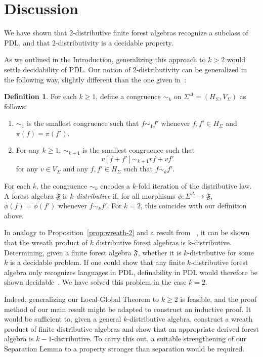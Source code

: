 \documentclass[sigplan,9pt]{acmart}\settopmatter{printfolios=true,printccs=false,printacmref=false}
\newcounter{thm}
\newcounter{theorem}
\theoremstyle{definition}
\newtheorem{defin}[thm]{Definition}
\newcommand{\Ff}[0]{{\mathfrak{F}}}
\begin{document}
\section{Discussion}\label{sec:discussion}

We have shown that 2-distributive finite forest algebras recognize a subclass of PDL, and that 2-distributivity is a decidable property.

As we outlined in the Introduction, generalizing this approach to $k > 2$ would settle decidability of PDL.
Our notion of 2-distributivity can be generalized in the following way, slightly different than the one given in~\cite{straubing-new-2013}:


\begin{defin}
For each $k \geq 1$, define a congruence $\sim_k$ on $\Sigma^\Delta = (H_\Sigma, V_\Sigma)$ as follows:
\begin{enumerate}
\item $\sim_1$ is the smallest congruence such that $f \sim_1 f'$ whenever $f, f' \in H_\Sigma$ and $\pi(f) = \pi(f')$.
\item For any $k \geq 1$, $\sim_{k+1}$ is the smallest congruence such that \[v[f+f'] \sim_{k+1} vf + vf'\] for any $v \in V_\Sigma$ and any $f, f' \in H_\Sigma$ such that $f \sim_k f'$.
\end{enumerate}
\end{defin}
For each $k$, the congruence $\sim_k$ encodes a $k$-fold iteration of the distributive law.
A forest algebra $\Ff$ is \emph{$k$-distributive} if, for all morphisms $\phi : \Sigma^\Delta \rightarrow \Ff$, $\phi(f) = \phi(f')$ whenever $f \sim_k f'$.
For $k = 2$, this coincides with our definition above.

In analogy to Proposition~\ref{prop:wreath-2} and a result from ~\cite{straubing-new-2013}, it can be shown that the wreath product of $k$ distributive forest algebras is k-distributive.
Determining, given a finite forest algebra $\Ff$, whether it is $k$-distributive for some $k$ is a decidable problem.
If one could show that any finite $k$-distributive forest algebra only recognizes languages in PDL, definability in PDL would therefore be shown decidable~\cite{straubing-new-2013}.
We have solved this problem in the case $k=2$.

Indeed, generalizing our Local-Global Theorem to $k \geq 2$ is feasible, and the proof method of our main result might be adapted to construct an inductive proof.
It would be sufficient to, given a general $k$-distributive algebra, construct a wreath product of finite distributive algebras and show that an appropriate derived forest algebra is $k-1$-distributive. 
To carry this out, a suitable strengthening of our Separation Lemma to a property stronger than separation would be required.
\end{document}
